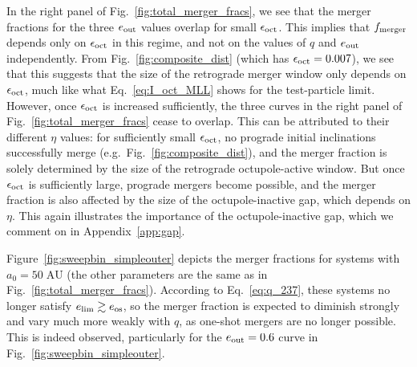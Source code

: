 \documentclass[
        fleqn,
        usenatbib,
    ]{mnras}
\begin{document}
In the right panel of Fig.~\ref{fig:total_merger_fracs}, we see that the merger
fractions for the three $e_{\rm out}$ values overlap for small $\epsilon_{\rm
oct}$. This implies that $f_{\rm merger}$ depends only on $\epsilon_{\rm oct}$
in this regime, and not on the values of $q$ and $e_{\rm out}$ independently.
From Fig.~\ref{fig:composite_dist} (which has $\epsilon_{\rm oct} = 0.007$), we
see that this suggests that the size of the retrograde merger window only
depends on $\epsilon_{\rm oct}$, much like what Eq.~\eqref{eq:I_oct_MLL} shows
for the test-particle limit. However, once $\epsilon_{\rm oct}$ is increased
sufficiently, the three curves in the right panel of
Fig.~\ref{fig:total_merger_fracs} cease to overlap. This can be attributed to
their different $\eta$ values: for sufficiently small $\epsilon_{\rm oct}$, no
prograde initial inclinations successfully merge (e.g.\
Fig.~\ref{fig:composite_dist}), and the merger fraction is solely determined by
the size of the retrograde octupole-active window. But once $\epsilon_{\rm oct}$
is sufficiently large, prograde mergers become possible, and the merger fraction
is also affected by the size of the octupole-inactive gap, which depends on
$\eta$. This again illustrates the importance of the octupole-inactive gap,
which we comment on in Appendix~\ref{app:gap}.

Figure~\ref{fig:sweepbin_simpleouter} depicts the merger fractions for systems
with $a_0 = 50\;\mathrm{AU}$ (the other parameters are the same as in
Fig.~\ref{fig:total_merger_fracs}). According to Eq.~\eqref{eq:q_237}, these
systems no longer satisfy $e_{\lim} \gtrsim e_{\rm os}$, so the
merger fraction is expected to diminish strongly and vary much more weakly with
$q$, as one-shot mergers are no longer possible. This is indeed observed,
particularly for the $e_{\rm out} = 0.6$ curve in
Fig.~\ref{fig:sweepbin_simpleouter}.
\end{document}
